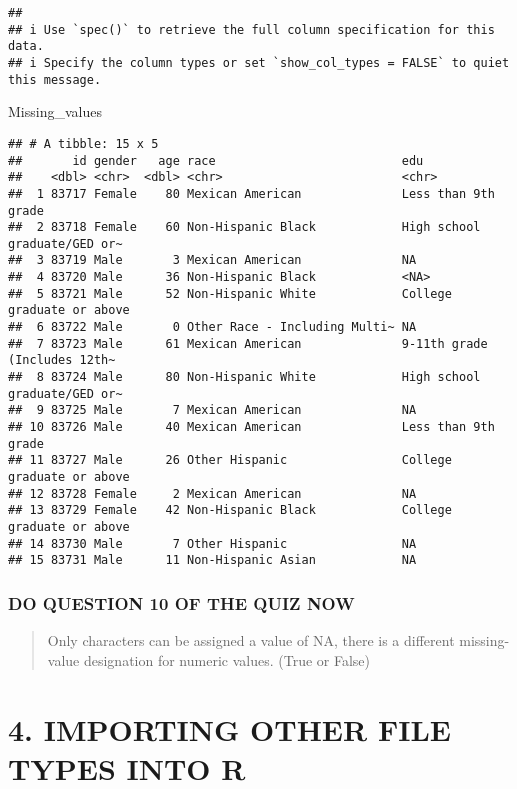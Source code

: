 \documentclass[
]{book}
\newenvironment{Shaded}{\begin{snugshade}}{\end{snugshade}}
\newcommand{\NormalTok}[1]{#1}
\begin{document}
\begin{verbatim}
##
## i Use `spec()` to retrieve the full column specification for this data.
## i Specify the column types or set `show_col_types = FALSE` to quiet this message.
\end{verbatim}

\begin{Shaded}
\begin{Highlighting}[]
\NormalTok{Missing\_values}
\end{Highlighting}
\end{Shaded}

\begin{verbatim}
## # A tibble: 15 x 5
##       id gender   age race                          edu
##    <dbl> <chr>  <dbl> <chr>                         <chr>
##  1 83717 Female    80 Mexican American              Less than 9th grade
##  2 83718 Female    60 Non-Hispanic Black            High school graduate/GED or~
##  3 83719 Male       3 Mexican American              NA
##  4 83720 Male      36 Non-Hispanic Black            <NA>
##  5 83721 Male      52 Non-Hispanic White            College graduate or above
##  6 83722 Male       0 Other Race - Including Multi~ NA
##  7 83723 Male      61 Mexican American              9-11th grade (Includes 12th~
##  8 83724 Male      80 Non-Hispanic White            High school graduate/GED or~
##  9 83725 Male       7 Mexican American              NA
## 10 83726 Male      40 Mexican American              Less than 9th grade
## 11 83727 Male      26 Other Hispanic                College graduate or above
## 12 83728 Female     2 Mexican American              NA
## 13 83729 Female    42 Non-Hispanic Black            College graduate or above
## 14 83730 Male       7 Other Hispanic                NA
## 15 83731 Male      11 Non-Hispanic Asian            NA
\end{verbatim}

\hypertarget{do-question-10-of-the-quiz-now-1}{%
\subsubsection{DO QUESTION 10 OF THE QUIZ NOW}\label{do-question-10-of-the-quiz-now-1}}

\begin{quote}
Only characters can be assigned a value of NA, there is a different missing-value designation for numeric values. (True or False)
\end{quote}

\hypertarget{importing-other-file-types-into-r}{%
\section{4. IMPORTING OTHER FILE TYPES INTO R}\label{importing-other-file-types-into-r}}
\end{document}
